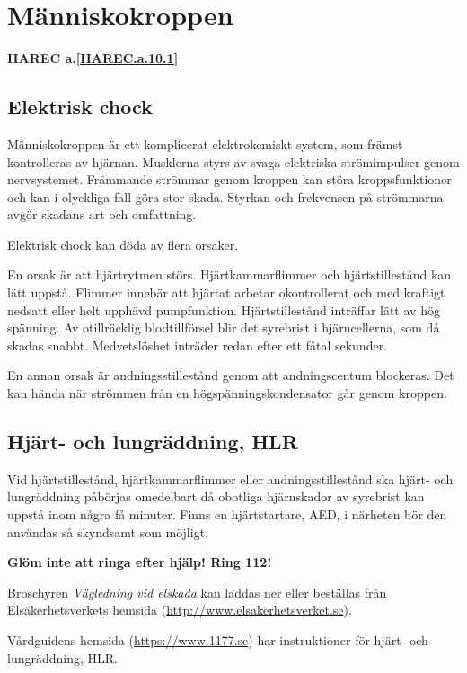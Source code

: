 \section{Människokroppen}
\textbf{
HAREC a.\ref{HAREC.a.10.1}\label{myHAREC.a.10.1}
}

\subsection{Elektrisk chock}

Människokroppen är ett komplicerat elektrokemiskt system, som främst
kontrolleras av hjärnan. Musklerna styrs av svaga elektriska
strömimpulser genom nervsystemet. Främmande strömmar genom kroppen kan
störa kroppsfunktioner och kan i olyckliga fall göra stor
skada. Styrkan och frekvensen på strömmarna avgör skadans art och
omfattning.

Elektrisk chock kan döda av flera orsaker.

En orsak är att hjärtrytmen störs. Hjärtkammarflimmer och
hjärtstillestånd kan lätt uppstå. Flimmer innebär att hjärtat arbetar
okontrollerat och med kraftigt nedsatt eller helt upphävd
pumpfunktion. Hjärtstillestånd inträffar lätt av hög spänning. Av
otillräcklig blodtillförsel blir det syrebrist i hjärncellerna, som då
skadas snabbt. Medvetslöshet inträder redan efter ett fåtal sekunder.

En annan orsak är andningsstillestånd genom att andningscentum
blockeras. Det kan hända när strömmen från en högspänningskondensator
går genom kroppen.

\subsection{Hjärt- och lungräddning, HLR}

Vid hjärtstillestånd, hjärtkammarflimmer eller andningsstillestånd ska
hjärt- och lungräddning påbörjas omedelbart då obotliga hjärnskador av
syrebrist kan uppstå inom några få minuter. Finns en hjärtstartare,
AED, i närheten bör den användas så skyndsamt som möjligt.

\textbf{Glöm inte att ringa efter hjälp! Ring 112!}

Broschyren \emph{Vägledning vid elskada} kan laddas ner eller beställas från
Elsäkerhetsverkets hemsida (\url{http://www.elsakerhetsverket.se}).

Vårdguidens hemsida (\url{https://www.1177.se}) har instruktioner för hjärt- och lungräddning, HLR.

